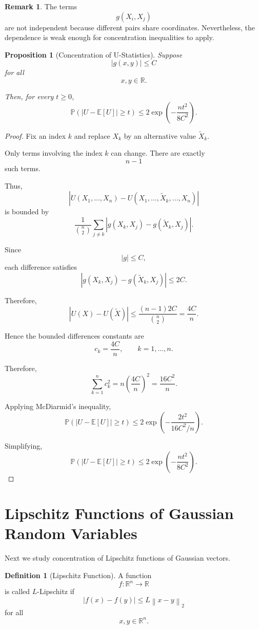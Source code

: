 \documentclass[12pt,oneside]{book}
\numberwithin{equation}{section}
\theoremstyle{definition}
\newtheorem{definition}{Definition}[section]
\newtheorem{remark}{Remark}[section]
\theoremstyle{plain}
\newtheorem{proposition}{Proposition}[section]
\theoremstyle{remark}
\newcommand{\R}{\mathbb{R}}
\newcommand{\E}{\mathbb{E}}
\newcommand{\Prob}{\mathbb{P}}
\newcommand{\norm}[1]{\left\lVert #1 \right\rVert}
\begin{document}
\begin{remark}
The terms
\[
g(X_i,X_j)
\]
are not independent because different pairs share coordinates. Nevertheless, the dependence is weak enough for concentration inequalities to apply.
\end{remark}

\begin{proposition}[Concentration of U-Statistics]
Suppose
\[
|g(x,y)|\leq C
\]
for all
\[
x,y\in\R.
\]

Then, for every $t\geq0$,
\[
\Prob\left(
|U-\E[U]|
\geq t
\right)
\leq
2\exp\left(
-\frac{nt^2}{8C^2}
\right).
\]
\end{proposition}

\begin{proof}
Fix an index $k$ and replace $X_k$ by an alternative value $\widetilde{X}_k$.

Only terms involving the index $k$ can change. There are exactly
\[
n-1
\]
such terms.

Thus,
\[
|U(X_1,\dots,X_n)-U(X_1,\dots,\widetilde{X}_k,\dots,X_n)|
\]
is bounded by
\[
\frac{1}{\binom{n}{2}}
\sum_{j\neq k}
|g(X_k,X_j)-g(\widetilde{X}_k,X_j)|.
\]

Since
\[
|g|\leq C,
\]
each difference satisfies
\[
|g(X_k,X_j)-g(\widetilde{X}_k,X_j)|
\leq
2C.
\]

Therefore,
\[
|U(X)-U(\widetilde{X})|
\leq
\frac{(n-1)2C}{\binom{n}{2}}
=
\frac{4C}{n}.
\]

Hence the bounded differences constants are
\[
c_k=\frac{4C}{n},
\qquad
k=1,\dots,n.
\]

Therefore,
\[
\sum_{k=1}^n c_k^2
=
n\left(\frac{4C}{n}\right)^2
=
\frac{16C^2}{n}.
\]

Applying McDiarmid's inequality,
\[
\Prob(|U-\E[U]|\geq t)
\leq
2\exp\left(
-\frac{2t^2}{16C^2/n}
\right).
\]

Simplifying,
\[
\Prob(|U-\E[U]|\geq t)
\leq
2\exp\left(
-\frac{nt^2}{8C^2}
\right).
\]
\end{proof}

\section{Lipschitz Functions of Gaussian Random Variables}

Next we study concentration of Lipschitz functions of Gaussian vectors.

\begin{definition}[Lipschitz Function]
A function
\[
f:\R^n\to\R
\]
is called $L$-Lipschitz if
\[
|f(x)-f(y)|
\leq
L\norm{x-y}_2
\]
for all
\[
x,y\in\R^n.
\]
\end{definition}
\end{document}
